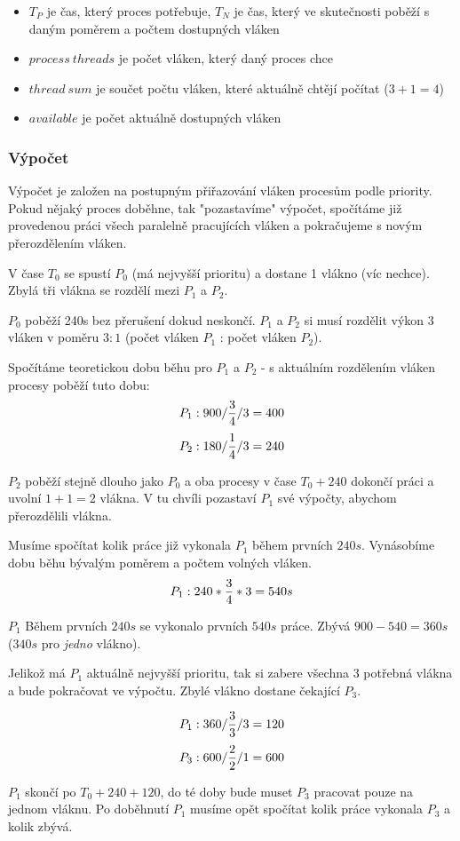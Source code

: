 \begin{itemize}
    \item $T_P$ je čas, který proces potřebuje, $T_N$ je čas, který ve skutečnosti poběží s daným poměrem a počtem dostupných vláken 
    \item $process\ threads$ je počet vláken, který daný proces chce
    \item $thread\ sum$ je součet počtu vláken, které aktuálně chtějí počítat ($3 + 1 = 4$)
    \item $available$ je počet aktuálně dostupných vláken
\end{itemize}

\subsubsection{Výpočet}
Výpočet je založen na postupným přiřazování vláken procesům podle priority. Pokud nějaký proces doběhne, tak "pozastavíme" výpočet, spočítáme již provedenou práci všech paralelně pracujících vláken a pokračujeme s novým přerozdělením vláken.

V čase $T_0$ se spustí $P_0$ (má nejvyšší prioritu) a dostane 1 vlákno (víc nechce). Zbylá tři vlákna se rozdělí mezi $P_1$ a $P_2$.

$P_0$ poběží 240s bez přerušení dokud neskončí. $P_1$ a $P_2$ si musí rozdělit výkon 3 vláken v poměru $3:1$ (počet vláken $P_1$ : počet vláken $P_2$).

Spočítáme teoretickou dobu běhu pro $P_1$ a $P_2$ - s aktuálním rozdělením vláken procesy poběží tuto dobu:
$$P_1: 900/{3 \over 4}/3=400$$
$$P_2: 180/{1 \over 4}/3=240$$

$P_2$ poběží stejně dlouho jako $P_0$ a oba procesy v čase $T_0+240$ dokončí práci a uvolní $1+1=2$ vlákna. V tu chvíli pozastaví $P_1$ své výpočty, abychom přerozdělili vlákna.

Musíme spočítat kolik práce již vykonala $P_1$ během prvních $240s$. Vynásobíme dobu běhu bývalým poměrem a počtem volných vláken.
$$P_1: 240*{3 \over 4}*3 = 540s$$

$P_1$ Během prvních $240s$ se vykonalo prvních $540s$ práce. Zbývá $900-540=360s$ ($340s$ pro \textit{jedno} vlákno).

Jelikož má $P_1$ aktuálně nejvyšší prioritu, tak si zabere všechna 3 potřebná vlákna a bude pokračovat ve výpočtu. Zbylé vlákno dostane čekající $P_3$.

$$P_1: 360/{3 \over 3}/3=120$$
$$P_3: 600/{2 \over 2}/1=600$$

$P_1$ skončí po $T_0+240+120$, do té doby bude muset $P_3$ pracovat pouze na jednom vláknu. Po doběhnutí $P_1$ musíme opět spočítat kolik práce vykonala $P_3$ a kolik zbývá.

